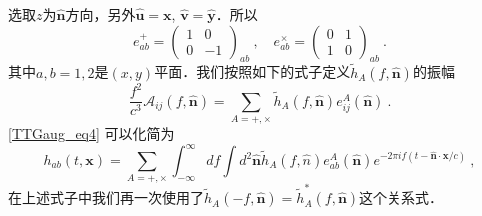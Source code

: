 选取$z$为$\hat{ \mathbf n }$方向，另外$\hat{ \mathbf u }=\mathbf x$, $\hat{ \mathbf v } = \hat{ \mathbf y }$．所以
\begin{equation}
e^+_{ab} = \begin{pmatrix}
1 & 0 \\
0 & -1 
\end{pmatrix}_{ab}~, \quad e^\times_{ab} = \begin{pmatrix}
0 & 1 \\
1 & 0 
\end{pmatrix}_{ab}~.
\end{equation}
其中$a,b = 1,2$是$(x,y)$平面．我们按照如下的式子定义$\tilde h_A(f,\hat{ {\mathbf n} })$的振幅
\begin{equation}
\frac{f^2}{c^3} \mathcal A_{ij} (f,\hat{ \mathbf n }) = \sum_{A = +,\times} \tilde h_{A} (f, \hat{  {\mathbf n} } ) e^A_{ij} (\hat{ {\mathbf n} } )~.
\end{equation}
\autoref{TTGaug_eq4} 可以化简为
\begin{equation}
h_{ab}(t,\mathbf x) = \sum_{A = +,\times} \int_{-\infty}^{\infty} df \int d^2 \hat{\mathbf n } \tilde h_A (f, \hat{ n }  ) e^A_{ab} ( \hat{ \mathbf n } ) e^{-2 \pi i f (t - \hat{ \mathbf n }\cdot {\mathbf x}/c )}~,
\end{equation}
在上述式子中我们再一次使用了$\tilde h_A (-f, \hat{ \mathbf n } ) = \tilde h_A^* (f, \hat{ \mathbf n }) $这个关系式．






 


 

















